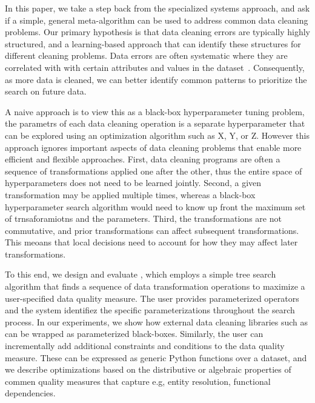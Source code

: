 
In this paper, we take a step back from the specialized systems approach, and ask if a simple, general meta-algorithm can be used to address common data cleaning problems.  Our primary hypothesis is that data cleaning errors are typically highly structured, and a learning-based approach that can identify these structures for different cleaning problems.   
Data errors are often systematic where they are correlated with with certain attributes and values in the dataset~\cite{rekatsinas2017holoclean,DBLP:journals/pvldb/KrishnanWWFG16}.
Consequently, as more data is cleaned, we can better identify common patterns to prioritize the search on future data.


A naive approach is to view this as a black-box hyperparameter tuning problem, the parametrs of each data cleaning operation is a separate hyperparameter that can be explored using an optimization algorithm such as X, Y, or Z.  However this approach ignores important aspects of data cleaning problems that enable more efficient and flexible approaches.  First, data cleaning programs are often a sequence of transformations applied one after the other, thus the entire space of hyperparameters does not need to be learned jointly.  Second, a given transformation may be applied multiple times, whereas a black-box hyperparameter search algorithm would need to know up front the maximum set of trnsaforamiotns and the parameters. Third, the transformations are not commutative, and prior transformations can affect subsequent transformations.  This meoans that local decisions need to account for how they may affect later transformations.  


To this end, we design and evaluate \sys, which employs a simple tree search algorithm that finds a sequence of data transformation operations to maximize a user-specified data quality measure.   The user provides parameterized operators and the system identifiez the specific parameterizations throughout the search process.  In our experiments, we show how external data cleaning libraries such as  can be wrapped as parameterized black-boxes.  Similarly, the user can incrementally add additional constraints and conditions to the data quality measure.  These can be expressed as generic Python functions over a dataset, and we describe optimizations based on the distributive or algebraic properties of commen quality measures that capture e.g, entity resolution, functional dependencies.

